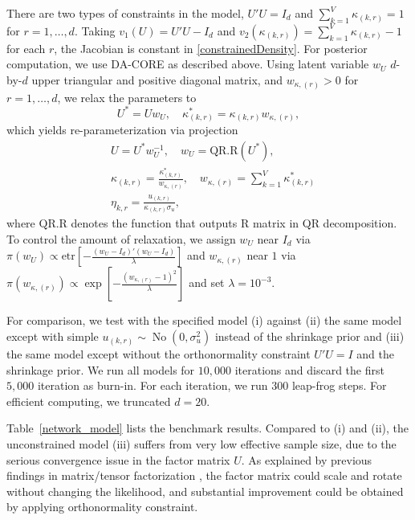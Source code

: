 \documentclass[10pt,fleqn]{article}
\DeclareMathOperator{\No}{No}
\DeclareMathOperator{\1}{\mathbbm{1}}
\begin{document}
 
There are two types of constraints in the model,  $U'U=I_d$ and $\sum_{k=1}^V \kappa_{(k,r)}=1$ for $r=1,\ldots,d$. Taking $v_1(U)= U'U-I_d$ and $v_2(\kappa_{(k,r)})=\sum_{k=1}^V \kappa_{(k,r)}-1$ for each $r$, the Jacobian is  constant in \eqref{constrainedDensity}. For posterior computation, we use DA-CORE
as described above.
Using latent variable $w_U$ $d$-by-$d$ upper triangular and positive diagonal
matrix, and $w_{\kappa,{(r)}}>0$  for $r=1,\ldots ,d$, we relax the parameters
to
$$U^*=U w_U, \quad \kappa^*_{(k,r)}=\kappa_{(k,r)} w_{\kappa,{(r)}},$$
which yields re-parameterization via  projection
\begin{equation}
\begin{aligned}
& U=U^* w_U^{-1}, \quad  w_U=\text{QR.R}(U^*), \\
& \kappa_{(k,r)} = \frac{\kappa^*_{(k,r)}}{w_{\kappa,{(r)}}}, \quad  w_{\kappa,{(r)}}= \sum_{k=1}^V \kappa^*_{(k,r)}\\
& \eta_{k,r}= \frac{u_{(k,r)}}{\kappa_{(k,r)}\sigma_{u}},
\end{aligned}   
\end{equation}where $\text{QR.R}$ denotes the function that outputs $\text{R}$ matrix in
QR decomposition.
To control the amount of relaxation, we assign $w_U$ near $I_d$ via $\pi(w_U)\propto \text{etr}\left[ -\frac{(w_U-I_d)'(w_U-I_d)}{\lambda}\right]$ and $w_{\kappa,{(r)}}$
near $1$ via $\pi(w_{\kappa,{(r)}})\propto \exp\left[ -\frac{(w_{\kappa,{(r)}}-1)^2}{\lambda}\right]$ and set $\lambda=10^{-3}$.


For comparison, we test with the specified model (i) against (ii) the  same
model except with simple $u_{(k,r)}\sim \No (0,\sigma^2_u)$ instead of the shrinkage prior and (iii) the  same
model except  without the orthonormality constraint $U'U=I$ and the shrinkage prior.
We run all models for $10,000$ iterations and discard the first $5,000$ iteration
as burn-in.
For each iteration, we run $300$ leap-frog steps. For efficient computing, we truncated $d=20$. 

Table~\ref{network_model} lists the benchmark results. Compared to (i) and
(ii), the unconstrained model (iii) suffers from very low effective sample
size, due to the serious convergence issue in the factor matrix $U$. As explained
by previous findings in matrix/tensor factorization \citep{hoff2016equivariant},   the factor matrix could
scale and rotate without changing the likelihood,  and  substantial improvement
could be obtained by applying orthonormality constraint.
\end{document}
